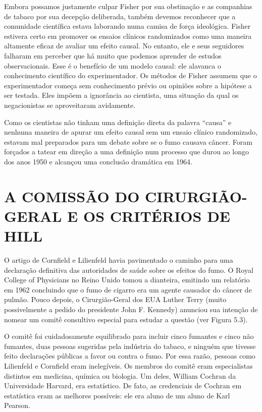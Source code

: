 \documentclass[11pt,a5paper,twoside]{book}
\begin{document}
Embora possamos justamente culpar Fisher por sua obstinação e as companhias de tabaco por sua decepção deliberada, também devemos reconhecer que a comunidade científica estava laborando numa camisa de força ideológica. Fisher estivera certo em promover os ensaios clínicos randomizados como uma maneira altamente eficaz de avaliar um efeito causal. No entanto, ele e seus seguidores falharam em perceber que há muito que podemos aprender de estudos observacionais. Esse é o benefício de um modelo causal: ele alavanca o conhecimento científico do experimentador. Os métodos de Fisher assumem que o experimentador começa sem conhecimento prévio ou opiniões sobre a hipótese a ser testada. Eles impõem a ignorância ao cientista, uma situação da qual os negacionistas se aproveitaram avidamente.

Como os cientistas não tinham uma definição direta da palavra “causa” e nenhuma maneira de apurar um efeito causal sem um ensaio clínico randomizado, estavam mal preparados para um debate sobre se o fumo causava câncer. Foram forçados a tatear em direção a uma definição num processo que durou ao longo dos anos 1950 e alcançou uma conclusão dramática em 1964.

\section{A COMISSÃO DO CIRURGIÃO-GERAL E OS CRITÉRIOS DE HILL}
O artigo de Cornfield e Lilienfeld havia pavimentado o caminho para uma declaração definitiva das autoridades de saúde sobre os efeitos do fumo. O Royal College of Physicians no Reino Unido tomou a dianteira, emitindo um relatório em 1962 concluindo que o fumo de cigarro era um agente causador do câncer de pulmão. Pouco depois, o Cirurgião-Geral dos EUA Luther Terry (muito possivelmente a pedido do presidente John F. Kennedy) anunciou sua intenção de nomear um comitê consultivo especial para estudar a questão (ver Figura 5.3).

O comitê foi cuidadosamente equilibrado para incluir cinco fumantes e cinco não fumantes, duas pessoas sugeridas pela indústria do tabaco, e ninguém que tivesse feito declarações públicas a favor ou contra o fumo. Por essa razão, pessoas como Lilienfeld e Cornfield eram inelegíveis. Os membros do comitê eram especialistas distintos em medicina, química ou biologia. Um deles, William Cochran da Universidade Harvard, era estatístico. De fato, as credenciais de Cochran em estatística eram as melhores possíveis: ele era aluno de um aluno de Karl Pearson.
\end{document}
